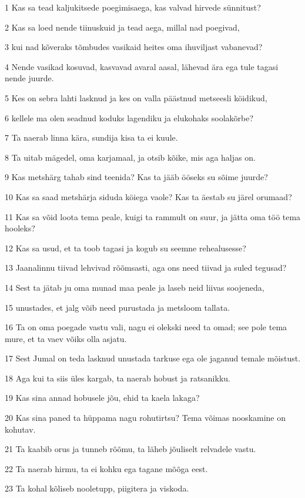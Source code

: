 \par 1 Kas sa tead kaljukitsede poegimisaega, kas valvad hirvede sünnitust?
\par 2 Kas sa loed nende tiinuskuid ja tead aega, millal nad poegivad,
\par 3 kui nad kõveraks tõmbudes vasikaid heites oma ihuviljast vabanevad?
\par 4 Nende vasikad kosuvad, kasvavad avaral aasal, lähevad ära ega tule tagasi nende juurde.
\par 5 Kes on sebra lahti lasknud ja kes on valla päästnud metseesli köidikud,
\par 6 kellele ma olen seadnud koduks lagendiku ja elukohaks soolakõrbe?
\par 7 Ta naerab linna kära, sundija kisa ta ei kuule.
\par 8 Ta uitab mägedel, oma karjamaal, ja otsib kõike, mis aga haljas on.
\par 9 Kas metshärg tahab sind teenida? Kas ta jääb ööseks su sõime juurde?
\par 10 Kas sa saad metshärja siduda köiega vaole? Kas ta äestab su järel orumaad?
\par 11 Kas sa võid loota tema peale, kuigi ta rammult on suur, ja jätta oma töö tema hooleks?
\par 12 Kas sa usud, et ta toob tagasi ja kogub su seemne rehealusesse?
\par 13 Jaanalinnu tiivad lehvivad rõõmsasti, aga ons need tiivad ja suled tegusad?
\par 14 Sest ta jätab ju oma munad maa peale ja laseb neid liivas soojeneda,
\par 15 unustades, et jalg võib need purustada ja metsloom tallata.
\par 16 Ta on oma poegade vastu vali, nagu ei olekski need ta omad; see pole tema mure, et ta vaev võiks olla asjatu.
\par 17 Sest Jumal on teda lasknud unustada tarkuse ega ole jaganud temale mõistust.
\par 18 Aga kui ta siis üles kargab, ta naerab hobust ja ratsanikku.
\par 19 Kas sina annad hobusele jõu, ehid ta kaela lakaga?
\par 20 Kas sina paned ta hüppama nagu rohutirtsu? Tema võimas nooskamine on kohutav.
\par 21 Ta kaabib orus ja tunneb rõõmu, ta läheb jõuliselt relvadele vastu.
\par 22 Ta naerab hirmu, ta ei kohku ega tagane mõõga eest.
\par 23 Ta kohal kõliseb nooletupp, piigitera ja viskoda.
